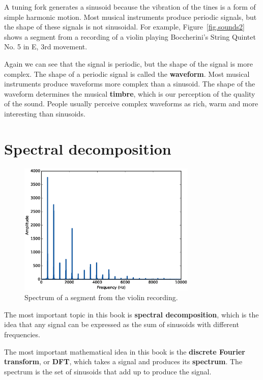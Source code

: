 \documentclass[12pt]{book}
\begin{document}
A tuning fork generates a sinusoid because the vibration of the tines
is a form of simple harmonic motion.  Most musical instruments
produce periodic signals, but the shape of these signals is not
sinusoidal.  For example, Figure~\ref{fig.sounds2} shows a segment
from a recording of a violin playing
Boccherini's String Quintet No. 5 in E, 3rd
movement.


Again we can see that the signal is periodic, but the shape of the
signal is more complex.  The shape of a periodic signal is called
the {\bf waveform}.  Most musical instruments produce waveforms more
complex than a sinusoid.  The shape of the waveform determines the
musical {\bf timbre}, which is our perception of the quality of the
sound.  People usually perceive complex waveforms as rich, warm and
more interesting than sinusoids.


\section{Spectral decomposition}

\begin{figure}
\centerline{\includegraphics[height=2.5in]{figs/sounds3.eps}}
\caption{Spectrum of a segment from the violin recording.}
\label{fig.sounds3}
\end{figure}

The most important topic in this book is {\bf spectral decomposition},
which is the idea that any signal can be expressed as the sum of
sinusoids with different frequencies.

The most important mathematical idea in this book is the {\bf discrete
  Fourier transform}, or {\bf DFT}, which takes a signal and produces
its {\bf spectrum}.  The spectrum is the set of sinusoids that add up to
produce the signal.
\end{document}
